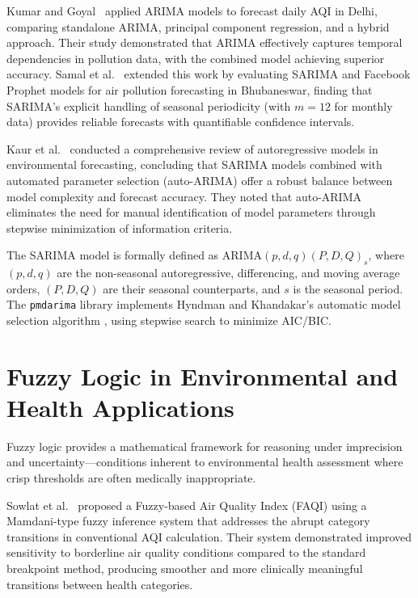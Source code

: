 \documentclass[12pt,a4paper]{report}
\begin{document}
Kumar and Goyal~\cite{Kumar2011forecasting} applied ARIMA models to forecast daily AQI in Delhi, comparing standalone ARIMA, principal component regression, and a hybrid approach. Their study demonstrated that ARIMA effectively captures temporal dependencies in pollution data, with the combined model achieving superior accuracy. Samal et al.~\cite{Samal2019sarima} extended this work by evaluating SARIMA and Facebook Prophet models for air pollution forecasting in Bhubaneswar, finding that SARIMA's explicit handling of seasonal periodicity (with $m=12$ for monthly data) provides reliable forecasts with quantifiable confidence intervals.

Kaur et al.~\cite{Kaur2023autoregressive} conducted a comprehensive review of autoregressive models in environmental forecasting, concluding that SARIMA models combined with automated parameter selection (auto-ARIMA) offer a robust balance between model complexity and forecast accuracy. They noted that auto-ARIMA eliminates the need for manual identification of model parameters through stepwise minimization of information criteria.

The SARIMA model is formally defined as $\text{ARIMA}(p,d,q)(P,D,Q)_s$, where $(p,d,q)$ are the non-seasonal autoregressive, differencing, and moving average orders, $(P,D,Q)$ are their seasonal counterparts, and $s$ is the seasonal period. The \texttt{pmdarima} library \cite{pmdarima2024} implements Hyndman and Khandakar's automatic model selection algorithm \cite{Hyndman2008forecast}, using stepwise search to minimize AIC/BIC.

\section{Fuzzy Logic in Environmental and Health Applications}

Fuzzy logic provides a mathematical framework for reasoning under imprecision and uncertainty---conditions inherent to environmental health assessment where crisp thresholds are often medically inappropriate.

Sowlat et al.~\cite{Sowlat2011faqi} proposed a Fuzzy-based Air Quality Index (FAQI) using a Mamdani-type fuzzy inference system that addresses the abrupt category transitions in conventional AQI calculation. Their system demonstrated improved sensitivity to borderline air quality conditions compared to the standard breakpoint method, producing smoother and more clinically meaningful transitions between health categories.
\end{document}
